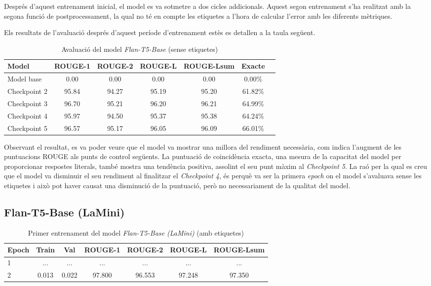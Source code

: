 Després d'aquest entrenament inicial, el model es va sotmetre a dos cicles addicionals. Aquest segon entrenament s'ha realitzat amb la segona funció de postprocessament, la qual no té en compte les etiquetes a l'hora de calcular l'error amb les diferents mètriques.

Els resultats de l'avaluació després d'aquest període d'entrenament estès es detallen a la taula següent.

\begin{table}[H]
    \centering
    \begin{tabular}{lcccccc}
    \toprule
    Model & ROUGE-1 & ROUGE-2 & ROUGE-L & ROUGE-Lsum & Exacte \\
    \midrule
    Model base   & 0.00  & 0.00  & 0.00  & 0.00  & 0.00\% \\
    Checkpoint 2 & 95.84 & 94.27 & 95.19 & 95.20 & 61.82\% \\
    Checkpoint 3 & 96.70 & 95.21 & 96.20 & 96.21 & 64.99\% \\
    Checkpoint 4 & 95.97 & 94.50 & 95.37 & 95.38 & 64.24\% \\
    Checkpoint 5 & 96.57 & 95.17 & 96.05 & 96.09 & 66.01\% \\
    \bottomrule
    \end{tabular}
    \caption[Avaluació del model \textit{Flan-T5-Base}]{Avaluació del model \textit{Flan-T5-Base} (sense etiquetes)}
\end{table}

Observant el resultat, es va poder veure que el model va mostrar una millora del rendiment necessària, com indica l'augment de les puntuacions ROUGE als punts de control següents. La puntuació de coincidència exacta, una mesura de la capacitat del model per proporcionar respostes literals, també mostra una tendència positiva, assolint el seu punt màxim al \textit{Checkpoint 5}. La raó per la qual es creu que el model va disminuir el seu rendiment al finalitzar el \textit{Checkpoint 4}, és perquè va ser la primera \textit{epoch} on el model s'avaluava sense les etiquetes i això pot haver causat una disminució de la puntuació, però no necessariament de la qualitat del model.





\subsection{Flan-T5-Base (LaMini)}
\begin{table}[H]
    \centering
    \begin{tabular}{lcccccc}
    \toprule
    Epoch & Train & Val & ROUGE-1 & ROUGE-2 & ROUGE-L & ROUGE-Lsum \\
    \midrule
    1 & ...   & ...   & ...    & ...    & ...    & ... \\
    2 & 0.013 & 0.022 & 97.800 & 96.553 & 97.248 & 97.350 \\
    \bottomrule
    \end{tabular}
    \caption[Primer entrenament del model \textit{Flan-T5-Base (LaMini)}]{Primer entrenament del model \textit{Flan-T5-Base (LaMini)} (amb etiquetes)}
\end{table}

